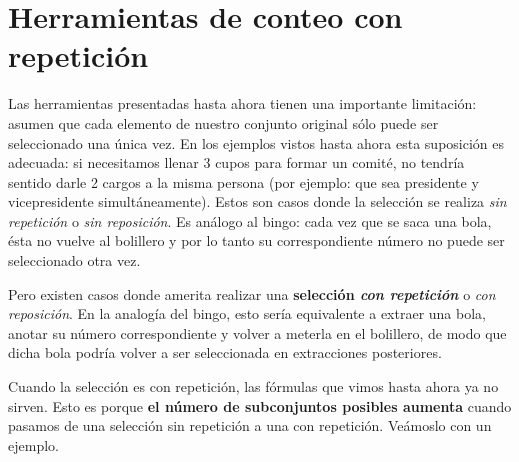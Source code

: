 \documentclass[
  letterpaper,
  DIV=11,
  numbers=noendperiod]{scrreprt}
\begin{document}
\hypertarget{herramientas-de-conteo-con-repeticiuxf3n}{%
\section{Herramientas de conteo con
repetición}\label{herramientas-de-conteo-con-repeticiuxf3n}}

Las herramientas presentadas hasta ahora tienen una importante
limitación: asumen que cada elemento de nuestro conjunto original sólo
puede ser seleccionado una única vez. En los ejemplos vistos hasta ahora
esta suposición es adecuada: si necesitamos llenar 3 cupos para formar
un comité, no tendría sentido darle 2 cargos a la misma persona (por
ejemplo: que sea presidente y vicepresidente simultáneamente). Estos son
casos donde la selección se realiza \emph{sin repetición} o \emph{sin
reposición}. Es análogo al bingo: cada vez que se saca una bola, ésta no
vuelve al bolillero y por lo tanto su correspondiente número no puede
ser seleccionado otra vez.

Pero existen casos donde amerita realizar una \textbf{selección
\emph{con repetición}} o \emph{con reposición}. En la analogía del
bingo, esto sería equivalente a extraer una bola, anotar su número
correspondiente y volver a meterla en el bolillero, de modo que dicha
bola podría volver a ser seleccionada en extracciones posteriores.

Cuando la selección es con repetición, las fórmulas que vimos hasta
ahora ya no sirven. Esto es porque \textbf{el número de subconjuntos
posibles aumenta} cuando pasamos de una selección sin repetición a una
con repetición. Veámoslo con un ejemplo.
\end{document}
